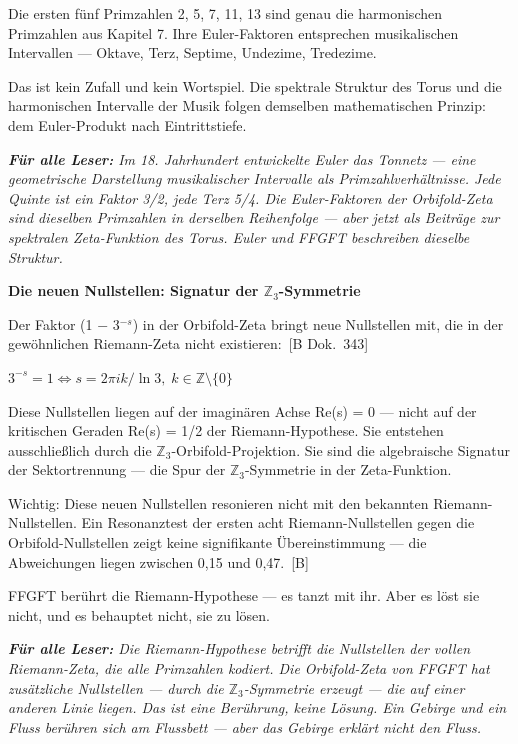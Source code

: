 \documentclass[11pt,oneside]{book}
\newcommand{\status}[1]{\penalty10000\,{\scriptsize\textcolor{gray!60}{[#1]}}}
\newenvironment{laierspur}{%
  \par\vspace{4pt}%
  \noindent\small\itshape\color{blue!60!black}%
  \textbf{Für alle Leser:}\enspace\ignorespaces}{%
  \par\vspace{4pt}\normalsize\normalfont\normalcolor}
\begin{document}
Die ersten fünf Primzahlen {2, 5, 7, 11, 13} sind genau die harmonischen
Primzahlen aus Kapitel 7. Ihre Euler-Faktoren entsprechen musikalischen
Intervallen — Oktave, Terz, Septime, Undezime, Tredezime.


Das ist kein Zufall und kein Wortspiel. Die spektrale Struktur des Torus
und die harmonischen Intervalle der Musik folgen demselben mathematischen
Prinzip: dem Euler-Produkt nach Eintrittstiefe.


\begin{laierspur}
Im 18. Jahrhundert entwickelte Euler das Tonnetz —
eine geometrische Darstellung musikalischer Intervalle als
Primzahlverhältnisse. Jede Quinte ist ein Faktor 3/2, jede Terz
5/4. Die Euler-Faktoren der Orbifold-Zeta sind dieselben Primzahlen
in derselben Reihenfolge — aber jetzt als Beiträge zur spektralen
Zeta-Funktion des Torus. Euler und FFGFT beschreiben dieselbe
Struktur.
\end{laierspur}

\textbf{Die neuen Nullstellen: Signatur der $\mathbb{Z}_3$-Symmetrie}


Der Faktor (1 $-$ 3$^{-s}$) in der Orbifold-Zeta bringt neue Nullstellen mit,
die in der gewöhnlichen Riemann-Zeta nicht existieren: \status{B Dok.~343}


$3^{-s} = 1 \Longleftrightarrow s = 2\pi i k/\ln 3,\; k \in \mathbb{Z}\setminus\{0\}$


Diese Nullstellen liegen auf der imaginären Achse Re(s) = 0 — nicht auf
der kritischen Geraden Re(s) = 1/2 der Riemann-Hypothese. Sie entstehen
ausschließlich durch die $\mathbb{Z}_3$-Orbifold-Projektion. Sie sind die algebraische
Signatur der Sektortrennung — die Spur der $\mathbb{Z}_3$-Symmetrie in der
Zeta-Funktion.


Wichtig: Diese neuen Nullstellen resonieren nicht mit den bekannten
Riemann-Nullstellen. Ein Resonanztest der ersten acht Riemann-Nullstellen
gegen die Orbifold-Nullstellen zeigt keine signifikante Übereinstimmung —
die Abweichungen liegen zwischen 0,15 und 0,47. \status{B}


FFGFT berührt die Riemann-Hypothese — es tanzt mit ihr. Aber es löst
sie nicht, und es behauptet nicht, sie zu lösen.


\begin{laierspur}
Die Riemann-Hypothese betrifft die Nullstellen der vollen
Riemann-Zeta, die alle Primzahlen kodiert. Die Orbifold-Zeta von FFGFT
hat zusätzliche Nullstellen — durch die $\mathbb{Z}_3$-Symmetrie erzeugt —
die auf einer anderen Linie liegen. Das ist eine Berührung, keine
Lösung. Ein Gebirge und ein Fluss berühren sich am Flussbett — aber
das Gebirge erklärt nicht den Fluss.
\end{laierspur}
\end{document}
